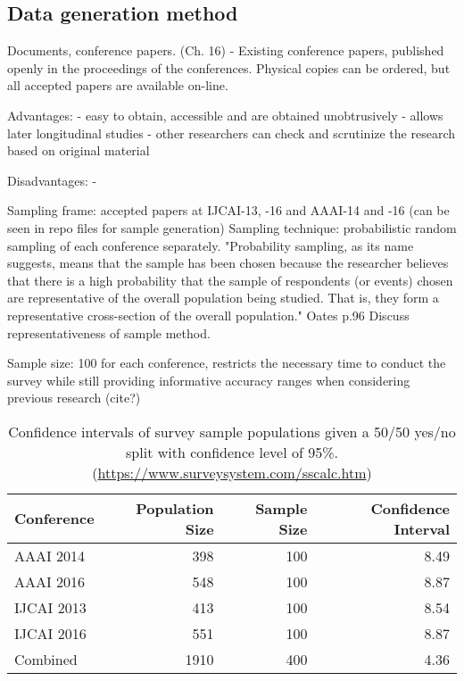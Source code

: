 \subsection{Data generation method}
Documents, conference papers. (Ch. 16)
- Existing conference papers, published openly in the proceedings of the conferences. Physical copies can be ordered, but all accepted papers are available on-line.

Advantages:
- easy to obtain, accessible and are obtained unobtrusively
- allows later longitudinal studies
- other researchers can check and scrutinize the research based on original material

Disadvantages:
-

Sampling frame: accepted papers at IJCAI-13, -16 and AAAI-14 and -16 (can be seen in repo files for sample generation)
Sampling technique: probabilistic random sampling of each conference separately.
        "Probability sampling, as its name suggests, means that the sample has been chosen because the researcher believes that there is a high probability that the sample of respondents (or events) chosen are representative of the overall population being studied. That is, they form a representative cross-section of the overall population." Oates p.96
        Discuss representativeness of sample method.

Sample size: 100 for each conference, restricts the necessary time to conduct the survey while still providing informative accuracy ranges when considering previous research (cite?)
\begin{table}[!h]
\begin{center}
    \begin{tabular}{  l | r  r  r }
    \textbf{Conference} & \textbf{Population Size} & \textbf{Sample Size} & \textbf{Confidence Interval} \\ \hline
    AAAI 2014 & 398 & 100 & 8.49 \\
    AAAI 2016 & 548 & 100 & 8.87 \\
    IJCAI 2013 & 413 & 100 & 8.54 \\
    IJCAI 2016 & 551 & 100 & 8.87 \\ \hline
    Combined & 1910 & 400 & 4.36 \\
    \end{tabular}
\end{center}
\caption{Confidence intervals of survey sample populations given a 50/50  yes/no split with confidence level of 95\%. (\url{https://www.surveysystem.com/sscalc.htm})}
\label{tab:survey-confidence}
\end{table}

